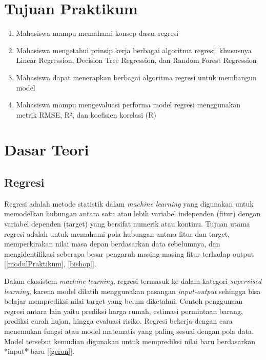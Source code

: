 \documentclass[a4paper,oneside,11pt]{book}
\begin{document}
\chapter{Tujuan Praktikum}
\begin{enumerate}
    \item Mahasiswa mampu memahami konsep dasar regresi
    \item Mahasiswa mengetahui prinsip kerja berbagai algoritma regresi, khususnya Linear Regression, Decision Tree Regression, dan Random Forest Regression
    \item Mahasiswa dapat menerapkan berbagai algoritma regresi untuk membangun model
    \item Mahasiswa mampu mengevaluasi performa model regresi menggunakan metrik RMSE, R², dan koefisien korelasi (R)
\end{enumerate}

\chapter{Dasar Teori}

\section{Regresi}
Regresi adalah metode statistik dalam \textit{machine learning} yang digunakan untuk memodelkan hubungan antara satu atau lebih variabel independen (fitur) dengan variabel dependen (target) yang bersifat numerik atau kontinu. Tujuan utama regresi adalah untuk memahami pola hubungan antara fitur dan target, memperkirakan nilai masa depan berdasarkan data sebelumnya, dan mengidentifikasi seberapa besar pengaruh masing-masing fitur terhadap output [\ref{modulPraktikum}, \ref{bishop}].

Dalam ekosistem \textit{machine learning}, regresi termasuk ke dalam kategori \textit{supervised learning}, karena model dilatih menggunakan pasangan \textit{input-output} sehingga bisa belajar memprediksi nilai target yang belum diketahui. Contoh penggunaan regresi antara lain yaitu prediksi harga rumah, estimasi permintaan barang, prediksi curah hujan, hingga evaluasi risiko. Regresi bekerja dengan cara menemukan fungsi atau model matematis yang paling sesuai dengan pola data. Model tersebut kemudian digunakan untuk memprediksi nilai baru berdasarkan *input* baru [\ref{geron}].

\end{document}
